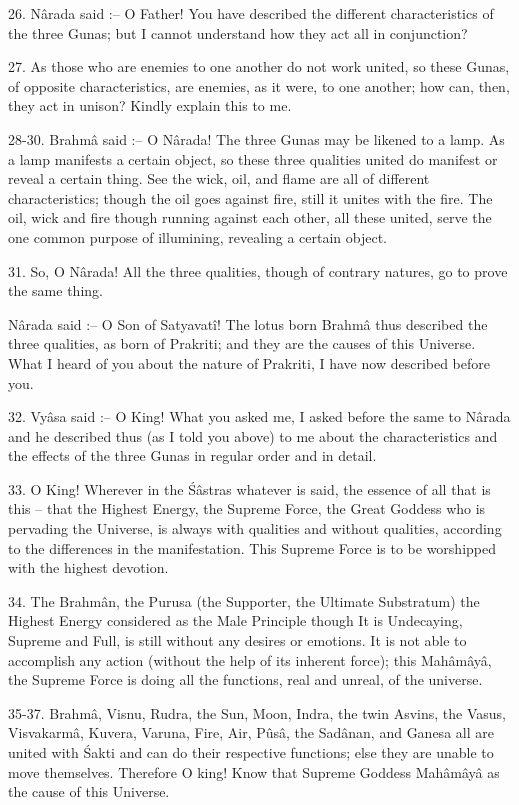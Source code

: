 26. N\^arada said :-- O Father! You have described the different characteristics of the three Gunas; but I cannot understand how they act all in conjunction?

27. As those who are enemies to one another do not work united, so these Gunas, of opposite characteristics, are enemies, as it were, to one another; how can, then, they act in unison? Kindly explain this to me.

28-30. Brahm\^a said :-- O N\^arada! The three Gunas may be likened to a lamp. As a lamp manifests a certain object, so these three qualities united do manifest or reveal a certain thing. See the wick, oil, and flame are all of different characteristics; though the oil goes against fire, still it unites with the fire. The oil, wick and fire though running against each other, all these united, serve the one common purpose of illumining, revealing a certain object.

31. So, O N\^arada! All the three qualities, though of contrary natures, go to prove the same thing.

N\^arada said :-- O Son of Satyavat\^i! The lotus born Brahm\^a thus described the three qualities, as born of Prakriti; and they are the causes of this Universe. What I heard of you about the nature of Prakriti, I have now described before you.

32. Vy\^asa said :-- O King! What you asked me, I asked before the same to N\^arada and he described thus (as I told you above) to me about the characteristics and the effects of the three Gunas in regular order and in detail.

33. O King! Wherever in the \'S\^astras whatever is said, the essence of all that is this -- that the Highest Energy, the Supreme Force, the Great Goddess who is pervading the Universe, is always with qualities and without qualities, according to the differences in the manifestation. This Supreme Force is to be worshipped with the highest devotion.

34. The Brahm\^an, the Purusa (the Supporter, the Ultimate Substratum) the Highest Energy considered as the Male Principle though It is Undecaying, Supreme and Full, is still without any desires or emotions. It is not able to accomplish any action (without the help of its inherent force); this Mah\^am\^ay\^a, the Supreme Force is doing all the functions, real and unreal, of the universe.

35-37. Brahm\^a, Visnu, Rudra, the Sun, Moon, Indra, the twin Asvins, the Vasus, Visvakarm\^a, Kuvera, Varuna, Fire, Air, Pûs\^a, the Sad\^anan, and Ganesa all are united with \'Sakti and can do their respective functions; else they are unable to move themselves. Therefore O king! Know that Supreme Goddess Mah\^am\^ay\^a as the cause of this Universe.

